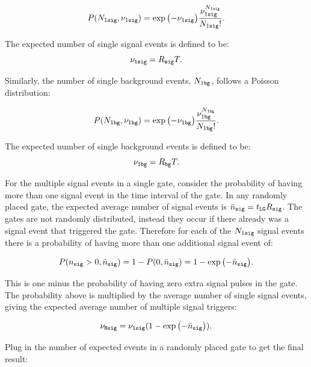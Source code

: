 \documentclass[twocolumn]{bmcart}
\begin{document}
\begin{backmatter}
\begin{equation*}
P( N_{1\tt sig} , \nu_{1\tt sig} ) = \exp{ \left( -\nu_{1\tt sig} \right) } \frac{ \nu_{1\tt sig}^{ N_{1\tt sig} } }{  N_{1\tt sig}! }.
\end{equation*}

The expected number of single signal events is defined to be:
\begin{equation} \label{eq:1sig}
\nu_{\tt 1 sig} = R_{\tt sig} T.
\end{equation}

Similarly, the number of single background events, $N_{1\tt bg}$,
follows a Poisson distribution:

\begin{equation*}
P( N_{1\tt bg}  , \nu_{1\tt bg} ) = \exp{ \left( -\nu_{1\tt bg} \right) } \frac{ \nu_{1\tt bg}^{ N_{1\tt bg} } }{  N_{1\tt bg}! }.
\end{equation*}

The expected number of single background events is defined to be:
\begin{equation} \label{eq:1bg}
\nu_{\tt 1 bg} = R_{\tt bg} T.
\end{equation}

For the multiple signal events in a single gate, consider the
probability of having more than one signal event in the time interval
of the gate.  In any randomly placed gate, the expected average number
of signal events is $\bar{ n }_{\tt sig} = t_{\tt LG} R_{\tt sig}$.
The gates are not randomly distributed, instead they occur if there
already was a signal event that triggered the gate.  Therefore for
each of the $N_{1\tt sig}$ signal events there is a probability of
having more than one additional signal event of:

\begin{equation*}
P( n_{\tt sig} > 0 , \bar{n}_{\tt sig} ) = 1 - P( 0, \bar{n}_{\tt sig} ) = 1 - \exp{ \left( -\bar{n}_{\tt sig} \right) } . 
\end{equation*}

This is one minus the probability of having zero extra signal pulses
in the gate.  The probability above is multiplied by the average
number of single signal events, giving the expected average number of
multiple signal triggers:

\begin{equation*}
\nu_{\tt N sig} = \nu_{\tt 1 sig} ( 1 - \exp{ \left( -\bar{n}_{\tt sig} \right) } ) .
\end{equation*}

Plug in the number of expected events in a randomly placed gate to get
the final result:


\end{backmatter}
\end{document}
